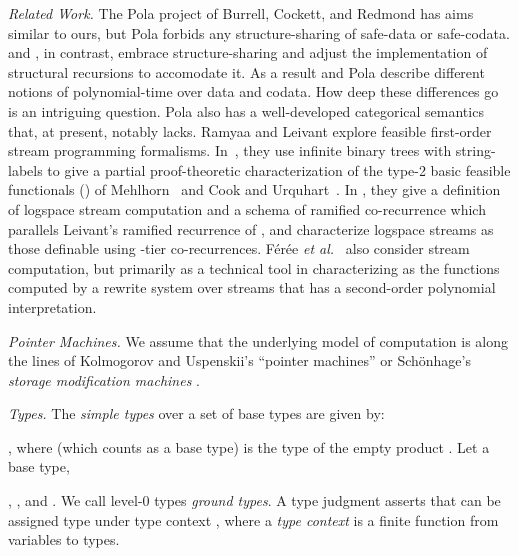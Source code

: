 \documentclass[envcountsame]{llncs}
\newcommand{\Topic}[1]{\smallskip\noindent{\textbf{#1{.}}}\enspace}
\begin{document}
\emph{Related Work.}
The Pola project of Burrell, Cockett, and Redmond
\cite{Burrell:2009,cockett:redmond:low:cat} has  aims similar to ours,
but Pola forbids any structure-sharing of safe-data or safe-codata.
 and , in contrast, embrace structure-sharing and
adjust the implementation of structural recursions to accomodate it.
As a result  and Pola describe different notions of
polynomial-time over data and codata.  
How deep these differences go is an intriguing question.
Pola also has a well-developed categorical
semantics that,  at present,  notably lacks.
Ramyaa and Leivant \cite{Ramyaa:2010,Ramyaa:Leivant:2011} explore
feasible first-order stream programming formalisms.
In~\cite{Ramyaa:2010}, they use infinite binary trees with
string-labels to give a partial proof-theoretic characterization of
the type-2 basic feasible functionals () of
Mehlhorn~\cite{Mehlhorn76} and Cook and
Urquhart~\cite{CookUrquhart:feasConstrArith}.  In
\cite{Ramyaa:Leivant:2011}, they give a definition of logspace
stream computation and a schema of ramified co-recurrence which
parallels Leivant's ramified recurrence of \cite{Leivant:FM2}, and
characterize logspace streams as those definable using -tier
co-recurrences.  F\'{e}r\'{e}e \emph{et al.}~\cite{Feree:2010} also
consider stream computation, but primarily as a technical tool in
characterizing  as the functions computed by a
rewrite system over streams that has a second-order polynomial
interpretation.












\Topic{Background}
\emph{Pointer Machines.} 
We assume that the underlying model of computation is along the
lines of Kolmogorov and Uspenskii's 
``pointer machines'' or Sch\"{o}nhage's \emph{storage modification 
machines}
\cite{vanEmdeBoas90}.


\emph{Types.} The \emph{simple types} over a  set of base types  are given by: 
    
    , where  
(which counts as a base type) is the type of the 
empty product .  
Let a base type, 
   
 ,  
  , 
and .
We call level-0 types 
\emph{ground types}.  
A type judgment  asserts
that  can be assigned type  under type context ,
where a \emph{type context} is a finite function from variables to types. 
\end{document}
